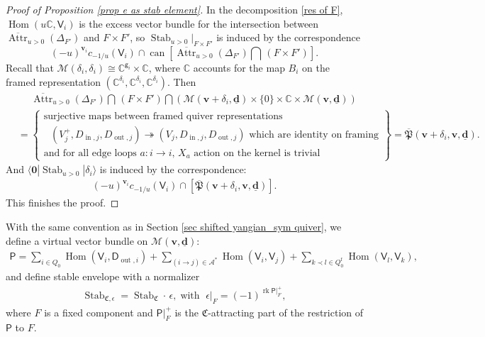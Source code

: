 \documentclass[10pt]{amsart}
\theoremstyle{definition}
\numberwithin{equation}{section}
\newcommand{\bC}{\mathbb{C}}
\newcommand{\bv}{\mathbf{v}}
\newcommand{\bd}{\mathbf{d}}
\newcommand{\cM}{\mathcal{M}}
\newcommand{\fC}{\mathfrak{C}}
\newcommand{\Attr}{\operatorname{Attr}}
\newcommand{\can}{\operatorname{can}}
\newcommand{\End}{\operatorname{End}}
\newcommand{\Hom}{\operatorname{Hom}}
\newcommand{\rk}{\operatorname{rk}}
\newcommand{\Stab}{\operatorname{Stab}}
\newcommand{\In}{\operatorname{in}}
\newcommand{\Out}{\operatorname{out}}
\begin{document}
\begin{proof}[Proof of Proposition \ref{prop e as stab element}]
In the decomposition \eqref{res of F}, $\Hom(u\bC, \mathsf V_i)$ is the excess vector bundle for the intersection between $\overline{\Attr}_{u>0}(\Delta_{F'})$ and $F\times F'$, so $\Stab_{u>0}\big|_{F\times F'}$ is induced by the correspondence $$(-u)^{\bv_i}c_{-1/u}(\mathsf V_i)\cap\can\left[\overline{\Attr}_{u>0}(\Delta_{F'})\bigcap \,(F\times F')\right].$$ 
Recall that $\cM(\delta_i,\delta_i)\cong \bC^{\mathsf g_i}\times \bC$, where $\bC$ accounts for the map $B_i$ on the framed representation $(\bC^{\delta_i},\bC^{\delta_i},\bC^{\delta_i})$. Then 
\begin{align*}
    &\quad \,\,\overline{\Attr}_{u>0}(\Delta_{F'})\bigcap\, (F\times F')\bigcap\left(\cM(\bv+\delta_i,\underline{\bd})\times \{0\}\times \bC\times \cM(\bv,\underline{\bd})\right)\\
    &=\left\{\substack{\text{surjective maps between framed quiver representations }\\\text{ $(V_j^+,D_{\In ,j},D_{\Out,j})\twoheadrightarrow (V_j,D_{\In ,j},D_{\Out,j})$ which are identity on framing}\\ \text{and for all edge loops $a:i\to i$, $X_a$ action on the kernel is trivial}}\right\}
    =\overline{\mathfrak{P}}(\bv+\delta_i,\bv,\underline{\bd}).
\end{align*}
And $\langle \mathbf 0|\Stab_{u>0}|\delta_i\rangle$ is induced by the correspondence:
\begin{align*}
    (-u)^{\bv_i} c_{-1/u}(\mathsf V_i)\cap[\overline{\mathfrak{P}}(\bv+\delta_i,\bv,\underline{\bd})].
\end{align*}
This finishes the proof.
\end{proof}

With the same convention as in Section \ref{sec shifted yangian_sym quiver}, we define a virtual vector bundle on $\cM(\bv,\underline{\bd})$:
\begin{align}\label{par pol on M(v,d)}
    \mathsf P=\sum_{i\in Q_0}\Hom(\mathsf V_i,\mathsf D_{\Out,i})+\sum_{(i\to j) \in \mathcal A^*}\Hom(\mathsf V_i,\mathsf V_j)+\sum_{k\prec l\in Q_0^{\mathrm{f}}}\Hom(\mathsf V_l,\mathsf V_k),
\end{align}
and define stable envelope with a normalizer
\begin{align}\label{normalizer_yangian}
    \Stab_{\fC,\epsilon}=\Stab_{\fC}\cdot \,\epsilon,\; \text{with }\;\epsilon|_F=(-1)^{\rk \mathsf P|_{F}^+},
\end{align}
where $F$ is a fixed component and $\mathsf P|_{F}^+$ is the $\fC$-attracting part of the restriction of $\mathsf P$ to $F$.
\end{document}
